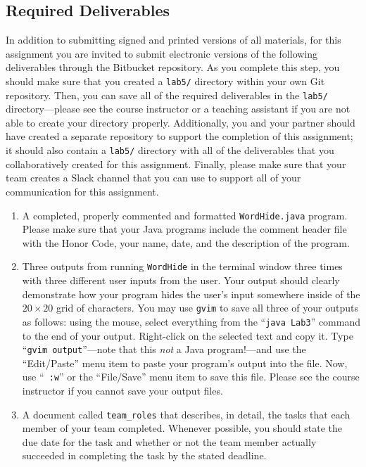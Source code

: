 \vspace*{-.1in}
\subsection*{Required Deliverables}

In addition to submitting signed and printed versions of all materials, for this assignment you are invited to submit
electronic versions of the following deliverables through the Bitbucket repository. As you complete this step, you
should make sure that you created a {\tt lab5/} directory within your own Git repository.  Then, you can save all of the
required deliverables in the {\tt lab5/} directory---please see the course instructor or a teaching assistant if you are
not able to create your directory properly. Additionally, you and your partner should have created a separate repository
to support the completion of this assignment; it should also contain a {\tt lab5/} directory with all of the
deliverables that you collaboratively created for this assignment. Finally, please make sure that your team creates a
Slack channel that you can use to support all of your communication for this assignment.

\begin{enumerate}

        \item A completed, properly commented and formatted {\tt WordHide.java} program. Please make sure that your Java
          programs include the comment header file with the Honor Code, your name, date, and the description of the
          program.

        \item Three outputs from running {\tt WordHide} in the terminal window three times with three different user
          inputs from the user. Your output should clearly demonstrate how your program hides the user's input somewhere
          inside of the $20 \times 20$ grid of characters.  You may use {\tt gvim} to save all three of your outputs as
          follows: using the mouse, select everything from the ``{\tt java Lab3}'' command to the end of your output.
          Right-click on the selected text and copy it.  Type ``{\tt gvim output}''---note that this {\em not} a Java
          program!---and use the ``Edit/Paste'' menu item to paste your program's output into the file.  Now, use ``{\tt
          :w}'' or the ``File/Save'' menu item to save this file. Please see the course instructor if you cannot save
          your output files.

        \item A document called {\tt team\_roles} that describes, in detail, the tasks that each member of your
          team completed. Whenever possible, you should state the due date for the task and whether or not the team
          member actually succeeded in completing the task by the stated deadline.

\end{enumerate}


